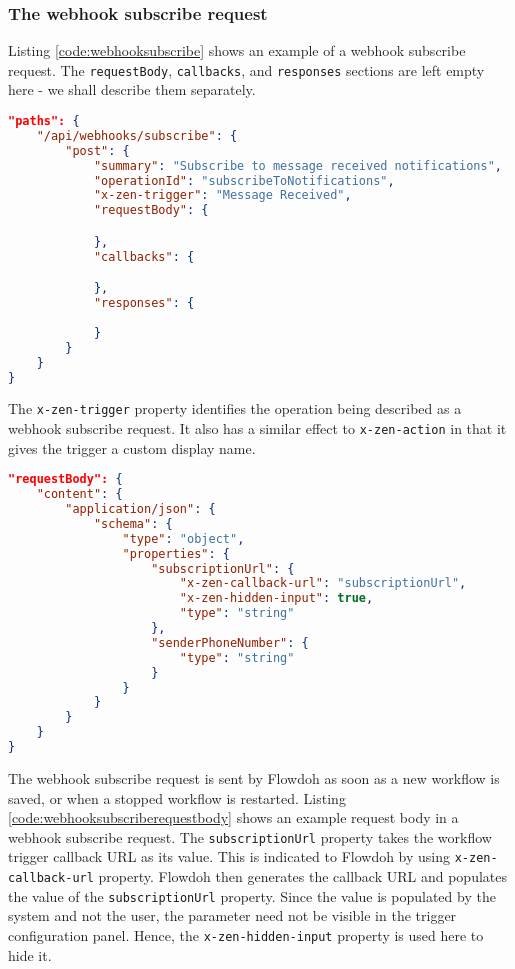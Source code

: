 \subsubsection{The webhook subscribe request}
Listing \ref{code:webhooksubscribe} shows an example of a webhook subscribe request. The \texttt{requestBody}, \texttt{callbacks}, and \texttt{responses} sections are left empty here - we shall describe them separately.
\begin{lstlisting}[caption={Webhook subscribe request},label={code:webhooksubscribe},language=json]
"paths": {
    "/api/webhooks/subscribe": {
        "post": {
            "summary": "Subscribe to message received notifications",
            "operationId": "subscribeToNotifications",
            "x-zen-trigger": "Message Received",
            "requestBody": {

            },
            "callbacks": {

            },
            "responses": {
                
            }
        }
    }
}
\end{lstlisting}
The \texttt{x-zen-trigger} property identifies the operation being described as a webhook subscribe request. It also has a similar effect to \texttt{x-zen-action} in that it gives the trigger a custom display name.
\begin{lstlisting}[caption={Webhook subscribe request - the request body},label={code:webhooksubscriberequestbody},language=json]
"requestBody": {
    "content": {
        "application/json": {
            "schema": {
                "type": "object",
                "properties": {
                    "subscriptionUrl": {
                        "x-zen-callback-url": "subscriptionUrl",
                        "x-zen-hidden-input": true,
                        "type": "string"
                    },
                    "senderPhoneNumber": {
                        "type": "string"
                    }
                }
            }
        }
    }
}
\end{lstlisting}
The webhook subscribe request is sent by Flowdoh as soon as a new workflow is saved, or when a stopped workflow is restarted.
Listing \ref{code:webhooksubscriberequestbody} shows an example request body in a webhook subscribe request. The \texttt{subscriptionUrl} property takes the workflow trigger callback URL as its value. This is indicated to Flowdoh by using \texttt{x-zen-callback-url} property. Flowdoh then generates the callback URL and populates the value of the \texttt{subscriptionUrl} property. Since the value is populated by the system and not the user, the parameter need not be visible in the trigger configuration panel. Hence, the \texttt{x-zen-hidden-input} property is used here to hide it.
